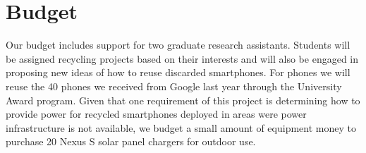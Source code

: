 \section{Budget}


\vspace*{-0.2in}

Our budget includes support for two graduate research assistants. Students
will be assigned recycling projects based on their interests and will also be
engaged in proposing new ideas of how to reuse discarded smartphones. For
phones we will reuse the 40 phones we received from Google last year through
the University Award program. Given that one requirement of this project is
determining how to provide power for recycled smartphones deployed in areas
were power infrastructure is not available, we budget a small amount of
equipment money to purchase 20 Nexus S solar panel chargers for outdoor use.

\vspace*{0.1in}
